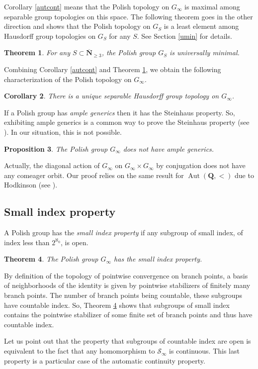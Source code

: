 \documentclass[JEP,XML,SOM,Unicode,NoFloatCountersInSection]{cedram}
\let\mathcal\mathscr
\theoremstyle{plain}
\newtheorem{thm}{Theorem}[section]
\newtheorem{prop}[thm]{Proposition}
\newtheorem{cor}[thm]{Corollary}
\theoremstyle{definition}
\newcommand{\NN}{\mathbf{N}}
\newcommand{\QQ}{\mathbf{Q}}
\newcommand{\cS}{\mathcal{S}}
\newcommand{\sinf}{\cS_\infty}
\DeclareMathOperator{\Aut}{Aut}
\begin{document}
Corollary \ref{autcont} means that the Polish topology on $G_\infty$ is maximal among separable group topologies on this space. The following theorem goes in the other direction and shows that the Polish topology on $G_S$ is a least element among Hausdorff group topologies on $G_S$ for any $S$. See Section \ref{umin} for details.

\begin{thm}\label{tumin}For any $S\subset\overline{\NN}_{\geq3}$, the Polish group $G_S$ is universally minimal.
\end{thm}
Combining Corollary \ref{autcont} and Theorem \ref{tumin}, we obtain the following characterization of the Polish topology on $G_\infty$.
\begin{cor}There is a unique separable Hausdorff group topology on $G_\infty$.
\end{cor}
If a Polish group has \emph{ample generics} then it has the Steinhaus property. So, exhibiting ample generics is a common way to prove the Steinhaus property (see \cite[\S1.6]{Kechris-Rosendal}). In our situation, this is not possible.

\begin{prop}\label{nag} The Polish group $G_\infty$ does not have ample generics.\end{prop}
Actually, the diagonal action of $G_\infty$ on $G_\infty\times G_\infty$ by conjugation does not have any comeager orbit. Our proof relies on the same result for $\Aut(\QQ,<)$ due to Hodkinson (see \cite{MR2354899}).

\subsection{Small index property} A Polish group has the \emph{small index property} if any subgroup of small index, \ie of index less than $2^{\aleph_0}$, is open.

\begin{thm}\label{sis}The Polish group $G_\infty$ has the small index property.
\end{thm}
By definition of the topology of pointwise convergence on branch points, a basis of neighborhoods of the identity is given by pointwise stabilizers of finitely many branch points. The number of branch points being countable, these subgroups have countable index. So, Theorem \ref{sis} shows that subgroups of small index contains the pointwise stabilizer of some finite set of branch points and thus have countable index.

Let us point out that the property that subgroups of countable index are open is equivalent to the fact that any homomorphism to $\sinf$ is continuous. This last property is a particular case of the automatic continuity property.
\end{document}
